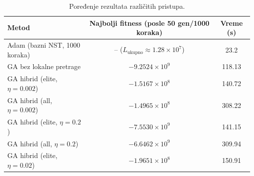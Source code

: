 \documentclass[a4paper,12pt]{article}
\begin{document}
\begin{table}[h]
\centering
\begin{tabular}{l|c|c}
\hline
Metod & Najbolji fitness (posle 50 gen/1000 koraka) & Vreme (s) \\
\hline
Adam (bazni NST, 1000 koraka) & -- ($L_{\text{ukupno}} \approx 1.28 \times 10^7$) & 23.2 \\
GA bez lokalne pretrage & $-9.2524 \times 10^9$ & 118.13 \\
GA hibrid (elite, $\eta=0.002$) & $-1.5167 \times 10^8$ & 140.72 \\
GA hibrid (all, $\eta=0.002$) & $-1.4965 \times 10^8$ & 308.22 \\
GA hibrid (elite, $\eta=0.2$) & $-7.5530 \times 10^9$ & 141.15 \\
GA hibrid (all, $\eta=0.2$) & $-6.6462 \times 10^9$ & 309.94 \\
GA hibrid (elite, $\eta=0.02$) & $-1.9651 \times 10^8$ & 150.91 \\
\hline
\end{tabular}
\caption{Poređenje rezultata različitih pristupa.}
\end{table}
\end{document}
